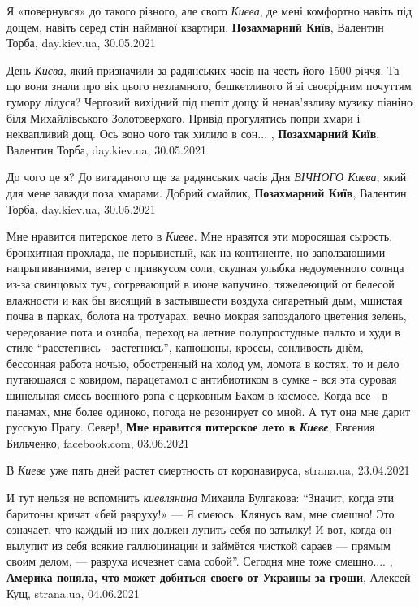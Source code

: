 Я «повернувся» до такого різного, але свого \emph{Києва}, де мені комфортно навіть під
дощем, навіть серед стін найманої квартири,
\textbf{Позахмарний Київ}, Валентин Торба, day.kiev.ua, 30.05.2021

День \emph{Києва}, який призначили за радянських часів на честь його
1500-річчя. Та що вони знали про вік цього незламного, бешкетливого й зі
своєрідним почуттям гумору дідуся? Черговий вихідний під шепіт дощу й
ненав’язливу музику піаніно біля Михайлівського Золотоверхого. Привід
прогулятись попри хмари і неквапливий дощ. Ось воно чого так хилило в сон... ,
\textbf{Позахмарний Київ}, Валентин Торба, day.kiev.ua, 30.05.2021

До чого це я? До вигаданого ще за радянських часів Дня \emph{ВІЧНОГО Києва},
який для мене завжди поза хмарами. Добрий смайлик,
\textbf{Позахмарний Київ}, Валентин Торба, day.kiev.ua, 30.05.2021

Мне нравится питерское лето в \emph{Киеве}. Мне нравятся эти моросящая сырость,
бронхитная прохлада, не порывистый, как на континенте, но заползающими
напрыгиваниями, ветер с привкусом соли, скудная улыбка недоуменного солнца
из-за свинцовых туч, согревающий в июне капучино, тяжелеющий от белесой
влажности и как бы висящий в застывшести воздуха сигаретный дым, мшистая почва
в парках, болота на тротуарах, вечно мокрая запоздалого цветения зелень,
чередование пота и озноба, переход на летние полупростудные пальто и худи в
стиле \enquote{расстегнись - застегнись}, капюшоны, кроссы, сонливость днём,
бессонная работа ночью, обостренный на холод ум, ломота в костях, то и дело
путающаяся с ковидом, парацетамол с антибиотиком в сумке - вся эта суровая
шинельная смесь военного рэпа с церковным Бахом в космосе. Когда все - в
панамах, мне более одиноко, погода не резонирует со мной. А тут она мне дарит
русскую Прагу. Север!,
\textbf{Мне нравится питерское лето в \emph{Киеве}}, Евгения Бильченко, facebook.com, 03.06.2021

В \emph{Киеве} уже пять дней растет смертность от коронавируса,
strana.ua, 23.04.2021

И тут нельзя не вспомнить \emph{киевлянина} Михаила Булгакова: \enquote{Значит, когда эти
баритоны кричат «бей разруху!» — Я смеюсь. Клянусь вам, мне смешно!  Это
означает, что каждый из них должен лупить себя по затылку!  И вот, когда он
вылупит из себя всякие галлюцинации и займётся чисткой сараев — прямым своим
делом, — разруха исчезнет сама собой}. Сегодня мне тоже смешно.... ,
\textbf{Америка поняла, что может добиться своего от Украины за гроши},
Алексей Кущ, strana.ua, 04.06.2021

